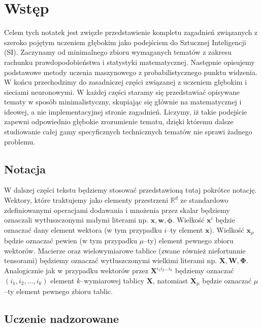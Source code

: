 \documentclass{myclass}
\numberwithin{equation}{subsection}
\begin{document}
{\footnotesize \tableofcontents}


\section{Wstęp}

Celem tych notatek jest zwięzłe przedstawienie kompletu zagadnień związanych z szeroko pojętym
uczeniem głębokim jako podejściem do Sztucznej Inteligencji (SI). Zaczynamy od minimalnego zbioru
wymaganych tematów z zakresu rachunku prawdopodobieństwa i statystyki matematycznej. Następnie
opisujemy podstawowe metody uczenia maszynowego z probabilistycznego punktu widzenia. W końcu
przechodzimy do zasadniczej części związanej z uczeniem głębokim i sieciami neuronowymi. W każdej
części staramy się przedstawiać opisywane tematy w sposób minimalistyczny, skupiając się głównie na
matematycznej i ideowej, a nie implementacyjnej stronie zagadnień. Liczymy, iż takie podejście
zapewni odpowiednio głębokie zrozumienie tematu, dzięki któremu dalsze studiowanie całej gamy
specyficznych technicznych tematów nie sprawi żadnego problemu.

\subsection{Notacja}

W dalszej części tekstu będziemy stosować przedstawioną tutaj pokrótce notację. Wektory, które
traktujemy jako elementy przestrzeni \(\mathbb{R}^d\) ze standardowo zdefiniowanymi operacjami
dodawania i mnożenia przez skalar będziemy oznaczali wytłuszczonymi małymi literami np. \(\bm{x},
\bm{w}, \bm{\phi}\). Wielkość \(\bm{x}^i\) będzie oznaczać dany element wektora (w tym przypadku
\(i\)--ty element \(\bm{x}\)). Wielkość \(\bm{x}_\mu\) będzie oznaczać pewien (w tym przypadku
\(\mu\)--ty) element pewnego zbioru wektorów. Macierze oraz wielowymiarowe tablice (zwane również
niefortunnie tensorami) będziemy oznaczać wytłuszczonymi wielkimi literami np. \(\bm{X}, \bm{W},
\bm{\Phi}\). Analogicznie jak w przypadku wektorów przez \(\bm{X}^{i_1 i_2 \ldots i_k}\) będziemy
oznaczać \((i_1,i_2,\ldots,i_k)\) element \(k\)--wymiarowej tablicy \(\bm{X}\), natomiast
\(\bm{X}_\mu\) będzie oznaczać \(\mu\)--ty element pewnego zbioru tablic.


\subsection{Uczenie nadzorowane}
\end{document}
